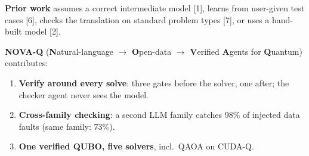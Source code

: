 \documentclass{article}
\newcommand{\key}[1]{{\bfseries #1}}
\begin{document}
\begin{tcbposter}
{\vspace{3mm}
\key{Prior work} assumes a correct intermediate model [1], learns from user-given test cases [6], checks the
translation on standard problem types [7], or uses a hand-built model [2].

\vspace{3mm}
\key{NOVA-Q} (\textbf{N}atural-language $\to$ \textbf{O}pen-data $\to$ \textbf{V}erified \textbf{A}gents for
\textbf{Q}uantum) contributes:
\begin{enumerate}[leftmargin=1.3em, itemsep=1mm, label=\textbf{\arabic*}]
\item \key{Verify around every solve}: three gates before the solver, one after; the checker agent never sees the model.
\item \key{Cross-family checking}: a second LLM family catches 98\% of injected data faults (same family: 73\%).
\item \key{One verified QUBO, five solvers}, incl.\ QAOA on CUDA-Q.
\end{enumerate}}


\end{tcbposter}
\end{document}
